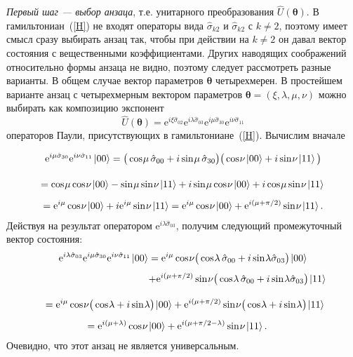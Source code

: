 \documentclass[a4paper]{report}
\newcommand{\ket}[1] {\!\!\;\ensuremath{\left|#1\right\rangle}}
\begin{document}
\textit{Первый шаг --- выбор анзаца}, т.е. унитарного преобразования $\hat{U}(\bm\theta)$. В гамильтониан~(\ref{H}) не входят операторы вида $\hat{\sigma}_{k2}$ и $\hat{\sigma}_{k2}$ с $k\neq2$, поэтому имеет смысл сразу выбирать анзац так, чтобы при действии на $k\neq2$ он давал вектор состояния с вещественными коэффициентами. Других наводящих соображений относительно формы анзаца не видно, поэтому следует рассмотреть разные варианты. В общем случае вектор параметров $\bm\theta$ четырехмерен. В простейшем варианте анзац с четырехмерным вектором параметров $\bm\theta=(\xi,\lambda,\mu,\nu)$ можно выбирать как композицию экспонент
\begin{equation}\label{ansatz}
\hat{U}(\bm\theta)= \mathrm{e}^{i\xi\hat{\sigma}_{02}}\mathrm{e}^{i\lambda\hat{\sigma}_{03}} \mathrm{e}^{i\mu\hat{\sigma}_{30}} \mathrm{e}^{i\nu\hat{\sigma}_{11}}
\end{equation}
операторов Паули, присутствующих в гамильтониане~(\ref{H}). Вычислим вначале
\begin{multline}\label{}
\mathrm{e}^{i\mu\hat{\sigma}_{30}} \mathrm{e}^{i\nu\hat{\sigma}_{11}}\ket{00}= \big(\cos\:\!\!\mu\,\hat{\sigma}_{00}+ i\sin\:\!\!\mu\,\hat{\sigma}_{30}\big)\big(\cos\:\!\!\nu\ket{00}+ i\sin\:\!\!\nu\ket{11}\big)
\vphantom{\int}\\
=\cos\:\!\!\mu\cos\:\!\!\nu\ket{00}- \sin\:\!\!\mu\sin\:\!\!\nu\ket{11}+ i\sin\:\!\!\mu\cos\:\!\!\nu\ket{00}+ i\cos\:\!\!\mu\sin\:\!\!\nu\ket{11}
\vphantom{\int}\\
=\mathrm{e}^{i\mu}\cos\:\!\!\nu\ket{00}+ i\mathrm{e}^{i\mu}\sin\:\!\!\nu\ket{11}= \mathrm{e}^{i\mu}\cos\:\!\!\nu\ket{00}+ \mathrm{e}^{i(\mu+\pi/2)}\sin\:\!\!\nu\ket{11}.
\nonumber
\end{multline}
Действуя на результат оператором $\mathrm{e}^{i\lambda\hat{\sigma}_{03}}$, получим следующий промежуточный вектор состояния:
\begin{multline}\label{3param}
\mathrm{e}^{i\lambda\hat{\sigma}_{03}} \mathrm{e}^{i\mu\hat{\sigma}_{30}} \mathrm{e}^{i\nu\hat{\sigma}_{11}}\ket{00}= \mathrm{e}^{i\mu}\cos\:\!\!\nu \big(\cos\:\!\!\lambda\,\hat{\sigma}_{00}+ i\sin\:\!\!\lambda\hat{\sigma}_{03}\big)
\ket{00}\\
\qquad\qquad\qquad\qquad\qquad\quad\: +\mathrm{e}^{i(\mu+\pi/2)}\sin\:\!\!\nu \big(\cos\:\!\!\lambda\,\hat{\sigma}_{00}+ i\sin\:\!\!\lambda\hat{\sigma}_{03}\big)
\ket{11} \vphantom{\int}\\
\;\;=\mathrm{e}^{i\mu}\cos\:\!\!\nu
\big(\cos\:\!\!\lambda+ i\sin\:\!\!\lambda\big)\ket{00}+
\mathrm{e}^{i(\mu+\pi/2)}\sin\:\!\!\nu
\big(\cos\:\!\!\lambda+ i\sin\:\!\!\lambda\big)\ket{11}
\vphantom{\int}\\
=\mathrm{e}^{i(\mu+\lambda)}\cos\:\!\!\nu\ket{00}+ \mathrm{e}^{i(\mu+\pi/2-\lambda)}\sin\:\!\!\nu\ket{11}.\quad\,
\end{multline}
Очевидно, что этот анзац не является универсальным.
\end{document}
